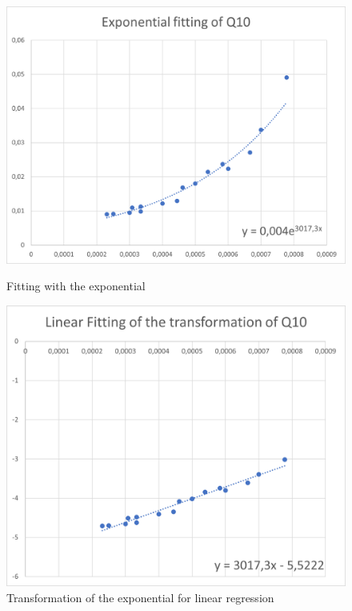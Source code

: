 \documentclass{article}
\begin{document}
                    \begin{figure}[htbp!]
                        \centering
                        \begin{minipage}[c]{.40\textwidth}
                            \centering
                            \includegraphics[width=\textwidth]{./data_analysis/Q10_exp_lambda_mu.png}
                            \caption{Fitting with the exponential}
                            \label{fig:Q10_exp_lambda_mu}
                        \end{minipage}
                        \hspace{10mm}
                        \begin{minipage}[c]{.40\textwidth}
                            \centering
                            \includegraphics[width=\textwidth]{./data_analysis/Q10_lin_lambda_mu.png}
                            \caption{Transformation of the exponential for linear regression}
                            \label{fig:Q10_lin_lambda_mu}
                        \end{minipage}
                    \end{figure}
                    
\end{document}
